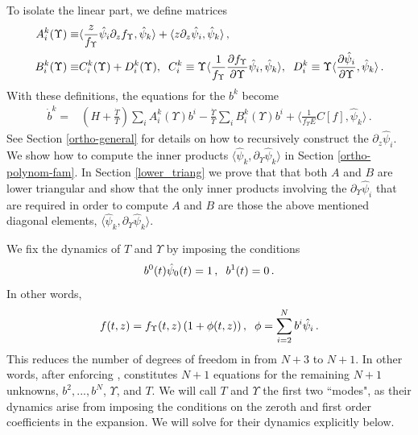 To isolate the linear part, we define matrices
\begin{align}\label{A_B_matrices}
A^k_i(\Upsilon)\equiv&\langle\frac{z}{f_\Upsilon }\hat\psi_i\partial_zf_\Upsilon ,\hat\psi_k\rangle+\langle z\partial_z \hat\psi_i,\hat\psi_k\rangle\,,\\
B^k_i(\Upsilon)\equiv& C_i^k(\Upsilon)+D_i^k(\Upsilon),\hspace{2mm} C_i^k\equiv\Upsilon\langle\frac{1}{f_\Upsilon }\frac{\partial f_\Upsilon }{\partial\Upsilon}\hat\psi_i,\hat\psi_k\rangle,\hspace{2mm} D_i^k\equiv\Upsilon\langle\frac{\partial\hat{\psi}_i}{\partial \Upsilon},\hat\psi_k\rangle\,. \notag
\end{align}
 With these definitions, the equations for the $b^k$ become
\begin{align}\label{b_eq}
\dot b^k=& \left(H+\frac{\dot{T}}{T}\right)\sum_i A_i^k(\Upsilon)b^i-\frac{\dot{\Upsilon}}{\Upsilon}\sum_i B_i^k(\Upsilon)b^i+\langle\frac{1}{f_\Upsilon E}C[f],\hat\psi_k\rangle\,.
\end{align}
 See Section \ref{ortho-general} for details on how to recursively construct the $\partial_z\hat\psi_i$. We show how to compute the inner products $\langle\hat\psi_k,\partial_{\Upsilon}\hat\psi_k\rangle$ in  Section \ref{ortho-polynom-fam}. In Section \ref{lower_triang} we prove that that both $A$ and $B$ are lower triangular and show that the only inner products involving the $\partial_\Upsilon\hat{\psi}_i$ that are required in order to compute $A$ and $B$ are those the above mentioned diagonal elements, $\langle\hat\psi_k,\partial_{\Upsilon}\hat\psi_k\rangle$.


We fix the dynamics of $T$ and $\Upsilon$ by imposing the conditions
\begin{equation}\label{b_ics}
b^0(t)\hat\psi_0(t)=1\,,\hspace{2mm}b^1(t)=0\,.
\end{equation}
In other words,
\begin{equation}
f(t,z)=f_\Upsilon (t,z)\left(1+\phi(t,z)\right),\hspace{2mm} \phi=\sum_{i=2}^N b^i\hat\psi_i\,.
\end{equation}
This reduces the number of degrees of freedom in  from $N+3$ to $N+1$.  In other words, after enforcing ,  constitutes $N+1$ equations for the remaining $N+1$ unknowns, $b^2,...,b^N$, $\Upsilon$, and $T$.  We will call $T$ and $\Upsilon$ the first two ``modes", as their dynamics arise from imposing the conditions  on the zeroth and first order coefficients in the expansion. We will solve for their dynamics explicitly below.

